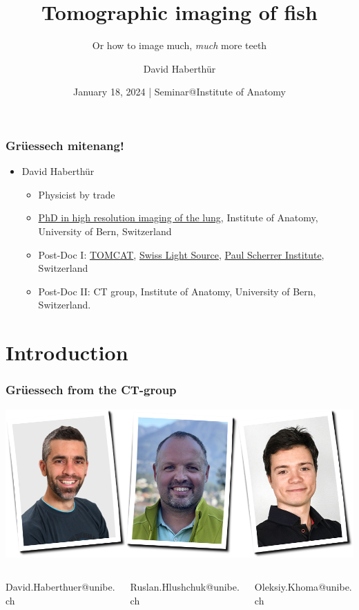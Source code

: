 \documentclass[aspectratio=169,10pt]{beamer}
\title{Tomographic imaging of fish}
\subtitle{Or how to image much, \emph{much} more teeth}
\author{David Haberthür}
\institute{Institute of Anatomy\\Universität Bern}
\date{January 18, 2024 | Seminar@Institute of Anatomy}
\newcommand{\imageheight}{0.618\paperheight}%
\newcommand{\uct}{{\textmu}CT\xspace}%
\begin{document}
{%
	\begin{frame}[noframenumbering]
		\maketitle
	\end{frame}%
}

\begin{frame}
	\frametitle{Grüessech mitenang!}
	\begin{itemize}
		\item David Haberthür
		\begin{itemize}
			\item Physicist by trade
			\item \href{https://boris.unibe.ch/2619/}{PhD in high resolution imaging of the lung}, Institute of Anatomy, University of Bern, Switzerland
			\item Post-Doc I: \href{https://www.psi.ch/sls/tomcat/}{TOMCAT}, \href{https://www.psi.ch/sls/}{Swiss Light Source}, \href{https://www.psi.ch/}{Paul Scherrer Institute}, Switzerland
			\item Post-Doc II: \uct{} group, Institute of Anatomy, University of Bern, Switzerland.
		\end{itemize}
	\end{itemize}
\end{frame}

\section{Introduction}
\begin{frame}
	\frametitle{Grüessech from the \uct-group}
	\centering
	\includegraphics[height=\imageheight]{./media/team}
		\begin{columns}
		\hfill\begin{column}{0.33\textwidth}
			\centering%
			David{\color{ubRed!61.8}.}Haberthuer{\color{ubRed!61.8}@unibe.ch}%
		\end{column}
		\begin{column}{0.33\textwidth}
			\centering%
			Ruslan{\color{ubRed!61.8}.}Hlushchuk{\color{ubRed!61.8}@unibe.ch}%
		\end{column}
		\begin{column}{0.33\textwidth}
			\centering%
			Oleksiy{\color{ubRed!61.8}.}Khoma{\color{ubRed!61.8}@unibe.ch}%
		\end{column}\hfill%
	\end{columns}
\end{frame}
\end{document}
